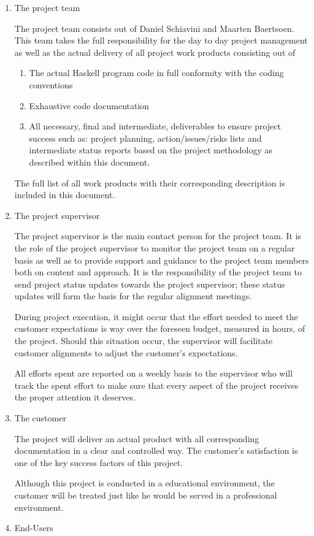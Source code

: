 \begin{enumerate}
	\item The project team

	The project team consists out of Daniel Schiavini and Maarten Baertsoen.
	This team takes the full responsibility for the day to day project management as well as the actual delivery of all project work products consisting out of
	\begin{enumerate}
		\item The actual Haskell program code in full conformity with the coding conventions
		\item Exhaustive code documentation
		\item All necessary, final and intermediate, deliverables to ensure project success such as: project planning, action/issues/risks lists and intermediate status reports based  on the project methodology as described within this document. 
	\end {enumerate}
	The full list of all work products with their corresponding description is included in this document.
	\item The project supervisor

	The project supervisor is the main contact person for the project team. It is the role of the project supervisor to monitor the project team on a regular basis as well as to provide support and guidance to the project team members both on content and approach.
	It is the responsibility of the project team to send project status updates towards the project supervisor; these status updates will form the basis for the regular alignment meetings. 

	During project execution, it might occur that the effort needed to meet the customer expectations is way over the foreseen budget, measured in hours, of the project. 
	Should this situation occur, the supervisor will facilitate customer alignments to adjust the customer’s expectations.

	All efforts spent are reported on a weekly basis to the supervisor who will track the spent effort to make sure that every aspect of the project receives the proper attention it deserves.

	\item The customer

	The project will deliver an actual product with all corresponding documentation in a clear and controlled way. 
	The customer's satisfaction is one of the key success factors of this project.

	Although this project is conducted in a educational environment, the customer will be treated just like he would be served in a professional environment. 
	\item End-Users


\end{enumerate}
